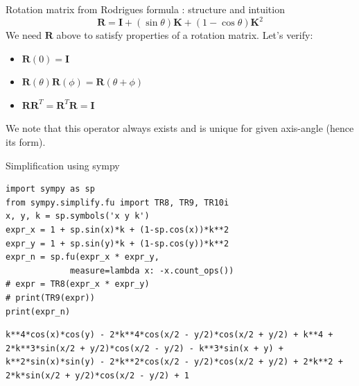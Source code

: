 \documentclass[presentation]{beamer}
\newcommand{\bv}[1]{\ensuremath{\mathbf{#1}}}
\begin{document}
\begin{frame}[label={sec:org44a0003}]{Rotation matrix from Rodrigues formula : structure and intuition}
 \[ \mathbf {R} =\mathbf {I} +(\sin \theta )\mathbf {K} +(1-\cos \theta )\mathbf {K} ^{2} \]
We need \(\bv{R}\) above to satisfy properties of a rotation matrix. Let's verify:
\begin{itemize}
\item \(\bv{R}(0) = \bv{I}\)
\item \(\bv{R}(\theta)\bv{R}(\phi) = \bv{R}(\theta+\phi)\)
\item \(\bv{R}\bv{R}^T = \bv{R}^T\bv{R} = \bv{I}\)
\end{itemize}
We note that this operator always exists and is unique for given axis-angle
(hence its form).
\end{frame}
\begin{frame}[label={sec:org73705e0},fragile]{Simplification using sympy}
 \begin{verbatim}
import sympy as sp
from sympy.simplify.fu import TR8, TR9, TR10i
x, y, k = sp.symbols('x y k')
expr_x = 1 + sp.sin(x)*k + (1-sp.cos(x))*k**2
expr_y = 1 + sp.sin(y)*k + (1-sp.cos(y))*k**2
expr_n = sp.fu(expr_x * expr_y,
             measure=lambda x: -x.count_ops())
# expr = TR8(expr_x * expr_y)
# print(TR9(expr))
print(expr_n)
\end{verbatim}

\begin{verbatim}
k**4*cos(x)*cos(y) - 2*k**4*cos(x/2 - y/2)*cos(x/2 + y/2) + k**4 + 2*k**3*sin(x/2 + y/2)*cos(x/2 - y/2) - k**3*sin(x + y) + k**2*sin(x)*sin(y) - 2*k**2*cos(x/2 - y/2)*cos(x/2 + y/2) + 2*k**2 + 2*k*sin(x/2 + y/2)*cos(x/2 - y/2) + 1
\end{verbatim}
\end{frame}
\end{document}
